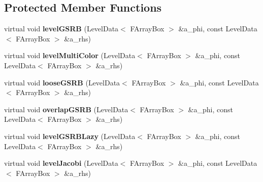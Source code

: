 \subsection*{Protected Member Functions}
\begin{DoxyCompactItemize}
\item 
\hypertarget{class_v_c_a_m_r_poisson_op_time_dep_a86ada6e4230a31835f3197d1b6d5d9cf}{virtual void {\bfseries level\-G\-S\-R\-B} (Level\-Data$<$ F\-Array\-Box $>$ \&a\-\_\-phi, const Level\-Data$<$ F\-Array\-Box $>$ \&a\-\_\-rhs)}\label{class_v_c_a_m_r_poisson_op_time_dep_a86ada6e4230a31835f3197d1b6d5d9cf}

\item 
\hypertarget{class_v_c_a_m_r_poisson_op_time_dep_a47b1215b758046cf56ce0c2f8e853cae}{virtual void {\bfseries level\-Multi\-Color} (Level\-Data$<$ F\-Array\-Box $>$ \&a\-\_\-phi, const Level\-Data$<$ F\-Array\-Box $>$ \&a\-\_\-rhs)}\label{class_v_c_a_m_r_poisson_op_time_dep_a47b1215b758046cf56ce0c2f8e853cae}

\item 
\hypertarget{class_v_c_a_m_r_poisson_op_time_dep_a77d08977d0af463ea415a6df3c1236b4}{virtual void {\bfseries loose\-G\-S\-R\-B} (Level\-Data$<$ F\-Array\-Box $>$ \&a\-\_\-phi, const Level\-Data$<$ F\-Array\-Box $>$ \&a\-\_\-rhs)}\label{class_v_c_a_m_r_poisson_op_time_dep_a77d08977d0af463ea415a6df3c1236b4}

\item 
\hypertarget{class_v_c_a_m_r_poisson_op_time_dep_ab144df9b5197f9b3e9071de0f20d5f77}{virtual void {\bfseries overlap\-G\-S\-R\-B} (Level\-Data$<$ F\-Array\-Box $>$ \&a\-\_\-phi, const Level\-Data$<$ F\-Array\-Box $>$ \&a\-\_\-rhs)}\label{class_v_c_a_m_r_poisson_op_time_dep_ab144df9b5197f9b3e9071de0f20d5f77}

\item 
\hypertarget{class_v_c_a_m_r_poisson_op_time_dep_a677b4e722ee1899674724a4aa02f302a}{virtual void {\bfseries level\-G\-S\-R\-B\-Lazy} (Level\-Data$<$ F\-Array\-Box $>$ \&a\-\_\-phi, const Level\-Data$<$ F\-Array\-Box $>$ \&a\-\_\-rhs)}\label{class_v_c_a_m_r_poisson_op_time_dep_a677b4e722ee1899674724a4aa02f302a}

\item 
\hypertarget{class_v_c_a_m_r_poisson_op_time_dep_a80dc36066670e0000b8ea0c6818c8fa3}{virtual void {\bfseries level\-Jacobi} (Level\-Data$<$ F\-Array\-Box $>$ \&a\-\_\-phi, const Level\-Data$<$ F\-Array\-Box $>$ \&a\-\_\-rhs)}\label{class_v_c_a_m_r_poisson_op_time_dep_a80dc36066670e0000b8ea0c6818c8fa3}


\end{DoxyCompactItemize}
